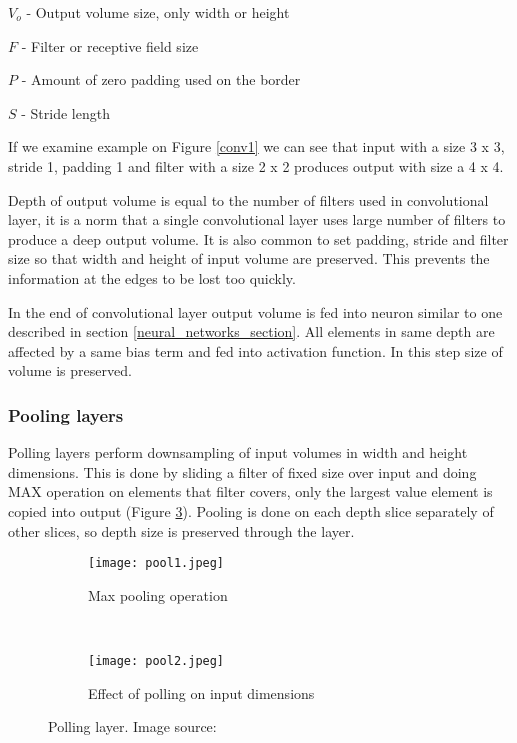 $V_{o}$ - Output volume size, only width or height

$F$ - Filter or receptive field size

$P$ - Amount of zero padding used on the border

$S$ - Stride length

If we examine example on Figure \ref{conv1} we can see that input with a size 3 x 3, stride 1, padding 1 and filter with a size 2 x 2 produces output with size a 4 x 4.

Depth of output volume is equal to the number of filters used in convolutional layer, it is a norm that a single convolutional layer uses large number of filters to produce a deep output volume\cite{cs231n}.
It is also common to set padding, stride and filter size so that width and height of input volume are preserved.
This prevents the information at the edges to be lost too quickly\cite{cs231n}.

In the end of convolutional layer output volume is fed into neuron similar to one described in section \ref{neural_networks_section}. 
All elements in same depth are affected by a same bias term and fed into activation function.
In this step size of volume is preserved.

\subsubsection{ Pooling layers}

Polling layers perform downsampling of input volumes in width and height dimensions.
This is done by sliding a filter of fixed size over input and doing MAX operation on elements that filter covers, only the largest value element is copied into output (Figure \ref{pool_layer}).
Pooling is done on each depth slice separately of other slices, so depth size is preserved through the layer.

\begin{figure}[ht] 
    \begin{subfigure}[b]{0.5\textwidth}
        \centering
        \texttt{[image: pool1.jpeg]} 
        \caption{Max pooling operation}
        \label{pool1}
    \end{subfigure}
    \unskip\ \vrule\ 
    \begin{subfigure}[b]{0.5\textwidth}
        \centering
        \texttt{[image: pool2.jpeg]} 
        \caption{ Effect of polling on input dimensions}
        \label{pool2}
    \end{subfigure}
    \caption{ Polling layer. Image source: \cite{cs231n}}
    \label{pool_layer}
\end{figure}

